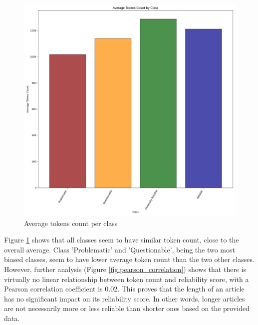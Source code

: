 \begin{figure}[htbp]
    \centering
    \includegraphics[width=0.8\linewidth]{figures/tokens_count_vx_per_class_hist.png}
    \caption{Average tokens count per class}
    \label{fig:avg_tokens_count_per_class}
\end{figure}

Figure \ref{fig:avg_tokens_count_per_class} shows that all classes seem to have similar token count, close to the overall average. Class 'Problematic' and 'Questionable', being the two most biased classes, seem to have lower average token count than the two other classes. However, further analysis (Figure \ref{fig:pearson_correlation}) shows that there is virtually no linear relationship between token count and reliability score, with a Pearson correlation coefficient is 0.02. This proves that the length of an article has no significant impact on its reliability score. In other words, longer articles are not necessarily more or less reliable than shorter ones based on the provided data.


